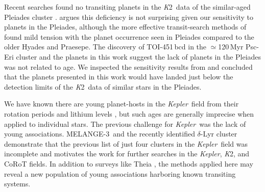 \documentclass[twocolumn, linenumbers]{aastex631}
\newcommand{\association}{MELANGE-3}
\newcommand{\kepler}{{\it Kepler}}
\newcommand{\ktwo}{{\textit K2}}
\begin{document}
Recent searches found no transiting planets in the \ktwo\ data of the similar-aged Pleiades cluster \citep{Gaidos:2017aa, Rizzuto2017}. \citet{Gaidos:2017aa} argues this deficiency is not surprising given our sensitivity to planets in the Pleiades, although the more effective transit-search methods of \citet{Rizzuto2017} found mild tension with the planet occurrence seen in Pleiades compared to the older Hyades and Praesepe. The discovery of TOI-451\,bcd in the $\simeq$120\,Myr Psc-Eri cluster \citep{THYMEIV} and the planets in this work suggest the lack of planets in the Pleiades was not related to age. We inspected the sensitivity results from \citet{Rizzuto2017} and concluded that the planets presented in this work would have landed just below the detection limits of the \ktwo\ data of similar stars in the Pleiades. 

We have known there are young planet-hosts in the \kepler\ field from their rotation periods \citep{2013MNRAS.436.1883W, 2021AJ....161..265D} and lithium levels \citep{2018ApJ...855..115B}, but such ages are generally imprecise when applied to individual stars. The previous challenge for \kepler\ was the lack of young associations. \association\ and the recently identified $\delta$-Lyr cluster \citep{2021arXiv211214776B} demonstrate that the previous list of just four clusters in the \kepler\ field was incomplete and motivates the work for further searches in the \kepler, \ktwo, and CoRoT \citep{2009A&A...506..411A} fields. In addition to surveys like Theia \citep{2019AJ....158..122K, 2020AJ....160..279K}, the methods applied here may reveal a new population of young associations harboring known transiting systems. 


\end{document}

